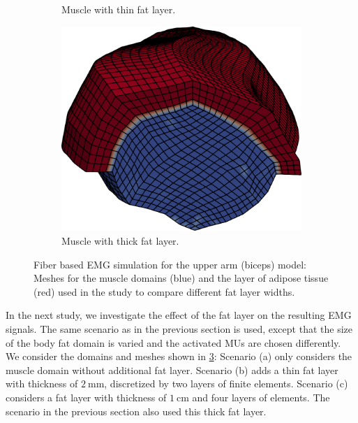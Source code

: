 \begin{figure}[H]
\begin{subfigure}[t]{0.3\textwidth}
    \caption{Muscle with thin fat layer.}%
    \label{fig:fibers_emg_mesh_thin_fat}%
  \end{subfigure}  \quad
  \begin{subfigure}[t]{0.3\textwidth}%
    \centering%
    \includegraphics[width=\textwidth]{images/results/application/fibers_emg_mesh_thick_fat.png}%
    \caption{Muscle with thick fat layer.}%
    \label{fig:fibers_emg_mesh_thick_fat}%
  \end{subfigure}   
  \caption{Fiber based EMG simulation for the upper arm (biceps) model: Meshes for the muscle domains (blue) and the layer of adipose tissue (red) used in the study to compare different fat layer widths.}%
  \label{fig:fibers_emg_mesh_fat}%
\end{figure}%

In the next study, we investigate the effect of the fat layer on the resulting EMG signals. The same scenario as in the previous section is used, except that the size of the body fat domain is varied and the activated MUs are chosen differently. We consider the domains and meshes shown in \cref{fig:fibers_emg_mesh_fat}: Scenario (a) only considers the muscle domain without additional  fat layer. Scenario (b) adds a thin fat layer with thickness of $\SI{2}{\milli\meter}$, discretized by two layers of finite elements. Scenario (c) considers a fat layer with thickness of $\SI{1}{\centi\meter}$ and four layers of elements. The scenario in the previous section also used this thick fat layer.

